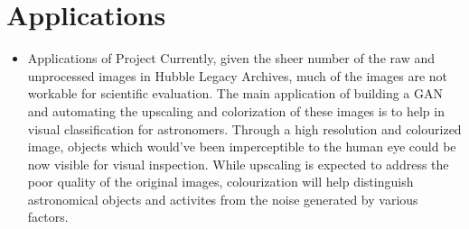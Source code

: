 \documentclass[oneside,a4paper,12pt]{report}
\begin{document}
\section{Applications}
\begin{itemize}
\item Applications of Project
          Currently, given the sheer number of the raw and unprocessed images in Hubble Legacy Archives, much of the images are not workable for scientific evaluation. The main application of building a GAN and automating the upscaling and colorization of these images is to help in visual classification for astronomers. Through a high resolution and colourized image, objects which would've been imperceptible to the human eye could be now visible for visual inspection. While upscaling is expected to address the poor quality of the original images, colourization will help distinguish astronomical objects and activites from the noise generated by various factors.
\end{itemize}
\end{document}
